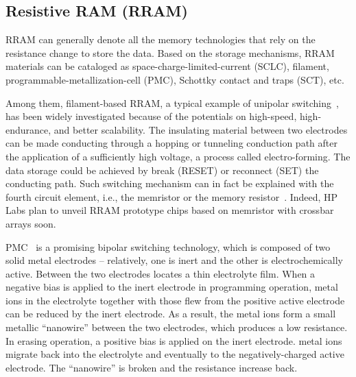 \subsection{Resistive RAM (RRAM)}
RRAM can generally denote all the memory technologies that rely on the resistance change to store the data. Based on the storage mechanisms, RRAM materials can be cataloged as space-charge-limited-current (SCLC), filament, programmable-metallization-cell (PMC), Schottky contact and traps (SCT), etc.

Among them, filament-based RRAM, a typical example of unipolar switching~\cite{Inoue}, has been widely investigated because of the potentials on high-speed, high-endurance, and better scalability. The insulating material between two electrodes can be made conducting through a hopping or tunneling conduction path after the application of a sufficiently high voltage, a process called electro-forming. The data storage could be achieved by break (RESET) or reconnect (SET) the conducting path. Such switching mechanism can in fact be explained with the fourth circuit element, i.e., the memristor or the memory resistor~\cite{Chua71,Tour08,Strukov08}. Indeed, HP Labs plan to unveil RRAM prototype chips based on memristor with crossbar arrays soon.

PMC~\cite{Kozicki05} is a promising bipolar switching technology, which is composed of two solid metal electrodes -- relatively, one is inert and the other is electrochemically active. Between the two electrodes locates a thin electrolyte film. When a negative bias is applied to the inert electrode in programming operation, metal ions in the electrolyte together with those flew from the positive active electrode can be reduced by the inert electrode. As a result, the metal ions form a small metallic ``nanowire'' between the two electrodes, which produces a low resistance. In erasing operation, a positive bias is applied on the inert electrode. metal ions migrate back into the electrolyte and eventually to the negatively-charged active electrode. The ``nanowire'' is broken and the resistance increase back.

